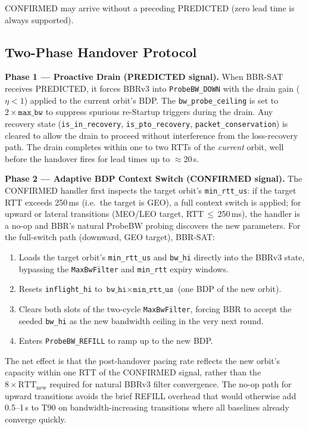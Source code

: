 \documentclass[conference]{IEEEtran}
\begin{document}
CONFIRMED may arrive without a preceding PREDICTED (zero lead time is
always supported).

\subsection{Two-Phase Handover Protocol}

\textbf{Phase 1 --- Proactive Drain (PREDICTED signal).}
When BBR-SAT receives PREDICTED, it forces BBRv3 into
\texttt{ProbeBW\_DOWN} with the drain gain ($\eta < 1$) applied to the
current orbit's BDP.
The \texttt{bw\_probe\_ceiling} is set to $2 \times \texttt{max\_bw}$ to
suppress spurious re-Startup triggers during the drain.
Any recovery state (\texttt{is\_in\_recovery}, \texttt{is\_pto\_recovery},
\texttt{packet\_conservation}) is cleared to allow the drain to proceed
without interference from the loss-recovery path.
The drain completes within one to two RTTs of the \emph{current} orbit,
well before the handover fires for lead times up to $\approx$20\,s.

\textbf{Phase 2 --- Adaptive BDP Context Switch (CONFIRMED signal).}
The CONFIRMED handler first inspects the target orbit's
\texttt{min\_rtt\_us}: if the target RTT exceeds 250\,ms (i.e.\ the
target is GEO), a full context switch is applied; for upward or lateral
transitions (MEO/LEO target, RTT\,$\leq$\,250\,ms), the handler is a
no-op and BBR's natural ProbeBW probing discovers the new parameters.
For the full-switch path (downward, GEO target), BBR-SAT:
\begin{enumerate}
  \item Loads the target orbit's \texttt{min\_rtt\_us} and \texttt{bw\_hi}
        directly into the BBRv3 state, bypassing the
        \texttt{MaxBwFilter} and \texttt{min\_rtt} expiry windows.
  \item Resets \texttt{inflight\_hi} to
        $\texttt{bw\_hi} \times \texttt{min\_rtt\_us}$
        (one BDP of the new orbit).
  \item Clears both slots of the two-cycle \texttt{MaxBwFilter},
        forcing BBR to accept the seeded \texttt{bw\_hi} as the new
        bandwidth ceiling in the very next round.
  \item Enters \texttt{ProbeBW\_REFILL} to ramp up to the new BDP.
\end{enumerate}

The net effect is that the post-handover pacing rate reflects the new
orbit's capacity within one RTT of the CONFIRMED signal, rather than
the $8 \times \mathrm{RTT}_\mathrm{new}$ required for natural BBRv3
filter convergence.
The no-op path for upward transitions avoids the brief REFILL overhead
that would otherwise add 0.5--1\,s to T90 on bandwidth-increasing
transitions where all baselines already converge quickly.
\end{document}
